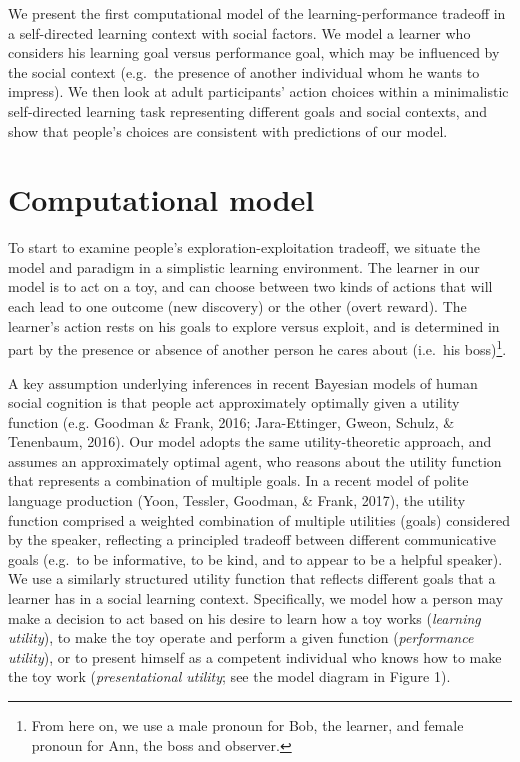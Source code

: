 \documentclass[10pt, letterpaper]{article}
\begin{document}
We present the first computational model of the learning-performance
tradeoff in a self-directed learning context with social factors. We
model a learner who considers his learning goal versus performance goal,
which may be influenced by the social context (e.g.~the presence of
another individual whom he wants to impress). We then look at adult
participants' action choices within a minimalistic self-directed
learning task representing different goals and social contexts, and show
that people's choices are consistent with predictions of our model.

\section{Computational model}\label{computational-model}

To start to examine people's exploration-exploitation tradeoff, we
situate the model and paradigm in a simplistic learning environment. The
learner in our model is to act on a toy, and can choose between two
kinds of actions that will each lead to one outcome (new discovery) or
the other (overt reward). The learner's action rests on his goals to
explore versus exploit, and is determined in part by the presence or
absence of another person he cares about (i.e.~his
boss)\footnote{From here on, we use a male pronoun for Bob, the learner, and female pronoun for Ann, the boss and observer.}.

A key assumption underlying inferences in recent Bayesian models of
human social cognition is that people act approximately optimally given
a utility function (e.g. Goodman \& Frank, 2016; Jara-Ettinger, Gweon,
Schulz, \& Tenenbaum, 2016). Our model adopts the same utility-theoretic
approach, and assumes an approximately optimal agent, who reasons about
the utility function that represents a combination of multiple goals. In
a recent model of polite language production (Yoon, Tessler, Goodman, \&
Frank, 2017), the utility function comprised a weighted combination of
multiple utilities (goals) considered by the speaker, reflecting a
principled tradeoff between different communicative goals (e.g.~to be
informative, to be kind, and to appear to be a helpful speaker). We use
a similarly structured utility function that reflects different goals
that a learner has in a social learning context. Specifically, we model
how a person may make a decision to act based on his desire to learn how
a toy works (\emph{learning utility}), to make the toy operate and
perform a given function (\emph{performance utility}), or to present
himself as a competent individual who knows how to make the toy work
(\emph{presentational utility}; see the model diagram in Figure 1).
\end{document}
